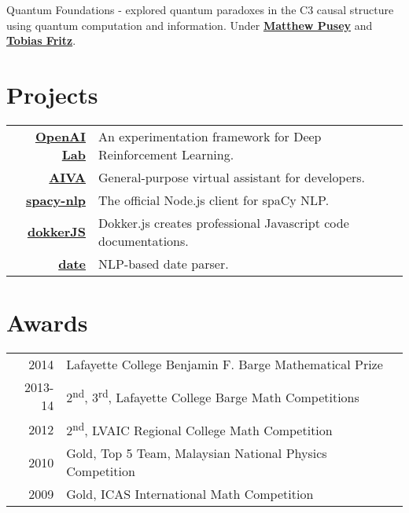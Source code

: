 \documentclass{deedy-resume-openfont}
\begin{document}
\begin{minipage}[t]{0.66\textwidth}
Quantum Foundations - explored quantum paradoxes in the C3 causal structure using quantum computation and information. Under \textbf{\href{https://www.mattpusey.uk/}{Matthew Pusey}} and \textbf{\href{http://perimeterinstitute.ca/personal/tfritz/}{Tobias Fritz}}.
\sectionsep


\section{Projects} 
\begin{tabular}{rll}

\href{https://github.com/kengz/openai_lab}{\bf OpenAI Lab}  & An experimentation framework for Deep Reinforcement Learning.\\
\href{https://github.com/kengz/aiva}{\bf AIVA}  & General-purpose virtual assistant for developers.\\
\href{https://github.com/kengz/spacy-nlp}{\bf spacy-nlp}  & The official Node.js client for spaCy NLP.\\
\href{https://github.com/kengz/dokker}{\bf dokkerJS}  &  Dokker.js creates professional Javascript code documentations. \\
\href{https://github.com/matthewmueller/date}{\bf date}  & NLP-based date parser.\\
\end{tabular}
\sectionsep


\section{Awards} 
\begin{tabular}{rll}
2014	     & Lafayette College Benjamin F. Barge Mathematical Prize\\
2013-14	     & 2\textsuperscript{nd}, 3\textsuperscript{rd}, Lafayette College Barge Math Competitions\\
2012	     & 2\textsuperscript{nd}, LVAIC Regional College Math Competition\\
2010     & Gold, Top 5 Team, Malaysian National Physics Competition  \\
2009     & Gold, ICAS International Math Competition \\
\end{tabular}
\sectionsep



\end{minipage}
\end{document}
